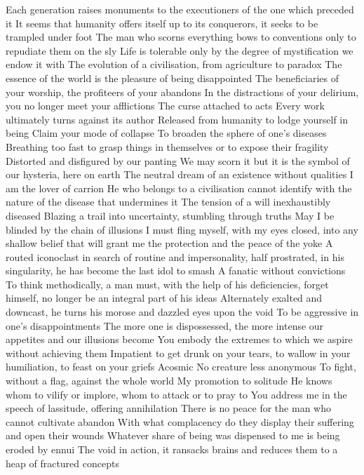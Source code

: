 \documentclass{article}
\begin{document}
Each generation raises monuments to the executioners of the one which preceded it
It seems that humanity offers itself up to its conquerors, it seeks to be trampled under foot
The man who scorns everything bows to conventions only to repudiate them on the sly
Life is tolerable only by the degree of mystification we endow it with
The evolution of a civilisation, from agriculture to paradox
The essence of the world is the pleasure of being disappointed
The beneficiaries of your worship, the profiteers of your abandons
In the distractions of your delirium, you no longer meet your afflictions
The curse attached to acts
Every work ultimately turns against its author
Released from humanity to lodge yourself in being
Claim your mode of collapse
To broaden the sphere of one's diseases
Breathing too fast to grasp things in themselves or to expose their fragility
Distorted and disfigured by our panting
We may scorn it but it is the symbol of our hysteria, here on earth
The neutral dream of an existence without qualities
I am the lover of carrion
He who belongs to a civilisation cannot identify with the nature of the disease that undermines it
The tension of a will inexhaustibly diseased
Blazing a trail into uncertainty, stumbling through truths
May I be blinded by the chain of illusions
I must fling myself, with my eyes closed, into any shallow belief that will grant me the protection and the peace of the yoke
A routed iconoclast in search of routine and impersonality, half prostrated, in his singularity, he has become the last idol to smash
A fanatic without convictions
To think methodically, a man must, with the help of his deficiencies, forget himself, no longer be an integral part of his ideas
Alternately exalted and downcast, he turns his morose and dazzled eyes upon the void
To be aggressive in one's disappointments
The more one is dispossessed, the more intense our appetites and our illusions become
You embody the extremes to which we aspire without achieving them
Impatient to get drunk on your tears, to wallow in your humiliation, to feast on your griefs
Acosmic
No creature less anonymous
To fight, without a flag, against the whole world
My promotion to solitude
He knows whom to vilify or implore, whom to attack or to pray to
You address me in the speech of lassitude, offering annihilation
There is no peace for the man who cannot cultivate abandon
With what complacency do they display their suffering and open their wounds
Whatever share of being was dispensed to me is being eroded by ennui
The void in action, it ransacks brains and reduces them to a heap of fractured concepts
\end{document}
